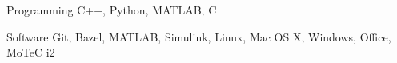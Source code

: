 
\begin{cvskills}
  \cvskill%
    {Programming}
    {C++, Python, MATLAB, C}

  \cvskill%
    {Software}
    {Git, Bazel, MATLAB, Simulink, Linux, Mac OS X, Windows, Office, MoTeC i2}
\end{cvskills}
